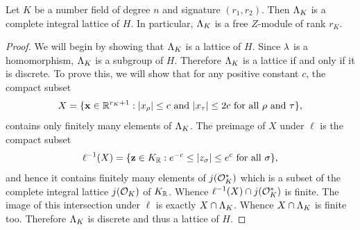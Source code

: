     \begin{theorem}\label{thm:unit_group_complete_lattice}
      Let \(K\) be a number field of degree \(n\) and signature \((r_{1},r_{2})\). Then \(\Lambda_{K}\) is a complete integral lattice of \(H\). In particular, \(\Lambda_{K}\) is a free \(Z\)-module of rank \(r_{K}\).
    \end{theorem}
    \begin{proof}
      We will begin by showing that \(\Lambda_{K}\) is a lattice of \(H\). Since \(\lambda\) is a homomorphism, \(\Lambda_{K}\) is a subgroup of \(H\). Therefore \(\Lambda_{K}\) is a lattice if and only if it is discrete. To prove this, we will show that for any positive constant \(c\), the compact subset 
      \[
        X = \{\mathbf{x} \in \mathbb{R}^{r_{K}+1}:|x_{\rho}| \le c \text{ and } |x_{\tau}| \le 2c \text{ for all } \rho \text{ and } \tau\},
      \]
      contains only finitely many elements of \(\Lambda_{K}\). The preimage of \(X\) under \(\ell\) is the compact subset
      \[
        \ell^{-1}(X) = \{\mathbf{z} \in K_{\mathbb{R}}:e^{-c} \le |z_{\sigma}| \le e^{c} \text{ for all } \sigma\},
      \]
      and hence it contains finitely many elements of \(j(\mathcal{O}_{K}^{\ast})\) which is a subset of the complete integral lattice \(j(\mathcal{O}_{K})\) of \(K_{\mathbb{R}}\). Whence \(\ell^{-1}(X) \cap j(\mathcal{O}_{K}^{\ast})\) is finite. The image of this intersection under \(\ell\) is exactly \(X \cap \Lambda_{K}\). Whence \(X \cap \Lambda_{K}\) is finite too. Therefore \(\Lambda_{K}\) is discrete and thus a lattice of \(H\).
      

\end{proof}
